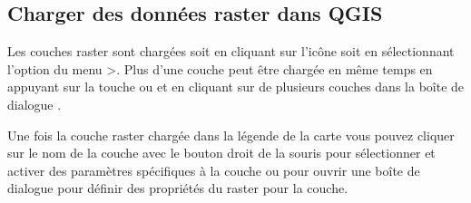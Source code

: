 \subsection{Charger des donn\'ees raster dans QGIS}\label{label_loadraster}

Les couches raster sont charg\'ees soit en cliquant sur l'ic\^one
 soit en
s\'electionnant l'option du menu
>. Plus d'une couche peut \^etre charg\'ee en m\^eme temps en appuyant
sur la touche  ou  et en cliquant sur de
plusieurs couches dans la bo\^ite de dialogue .

Une fois la couche raster charg\'ee dans la l\'egende de la carte vous pouvez
cliquer sur le nom de la couche avec le bouton droit de la souris pour
s\'electionner et activer des param\`etres sp\'ecifiques \`a la couche ou pour ouvrir
une bo\^ite de dialogue pour d\'efinir des propri\'et\'es du raster pour la couche.


